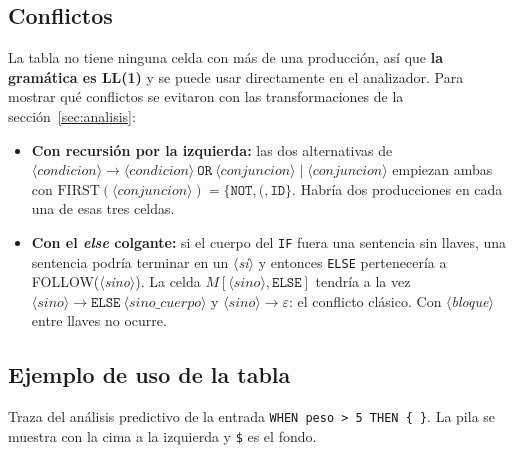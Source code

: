 \documentclass[10pt,a4paper]{article}
\newcommand{\nt}[1]{\ensuremath{\langle}\textit{#1}\ensuremath{\rangle}}   %
\newcommand{\tm}[1]{\texttt{#1}}                                          %
\begin{document}
\subsection{Conflictos}
\label{sec:conflictos}

La tabla no tiene ninguna celda con más de una producción, así que \textbf{la gramática es LL(1)} y se puede usar
directamente en el analizador. Para mostrar qué conflictos se evitaron con las transformaciones de la
sección~\ref{sec:analisis}:

\begin{itemize}[nosep]
\item \textbf{Con recursión por la izquierda:} las dos alternativas de
$\nt{condicion} \rightarrow \nt{condicion}\ \tm{OR}\ \nt{conjuncion} \mid \nt{conjuncion}$ empiezan ambas con
$\text{FIRST}(\nt{conjuncion}) = \{\tm{NOT}, \tm{(}, \tm{ID}\}$. Habría dos producciones en cada una de esas tres celdas.
\item \textbf{Con el \emph{else} colgante:} si el cuerpo del \tm{IF} fuera una sentencia sin llaves, una sentencia podría
terminar en un \nt{si} y entonces \tm{ELSE} pertenecería a FOLLOW(\nt{sino}). La celda $M[\nt{sino}, \tm{ELSE}]$ tendría a la
vez $\nt{sino} \rightarrow \tm{ELSE}\ \nt{sino\_cuerpo}$ y $\nt{sino} \rightarrow \varepsilon$: el conflicto clásico. Con
\nt{bloque} entre llaves no ocurre.
\end{itemize}

\subsection{Ejemplo de uso de la tabla}

Traza del análisis predictivo de la entrada \tm{WHEN peso > 5 THEN \{ \}}. La pila se muestra con la cima a la izquierda
y \tm{\$} es el fondo.
\end{document}
